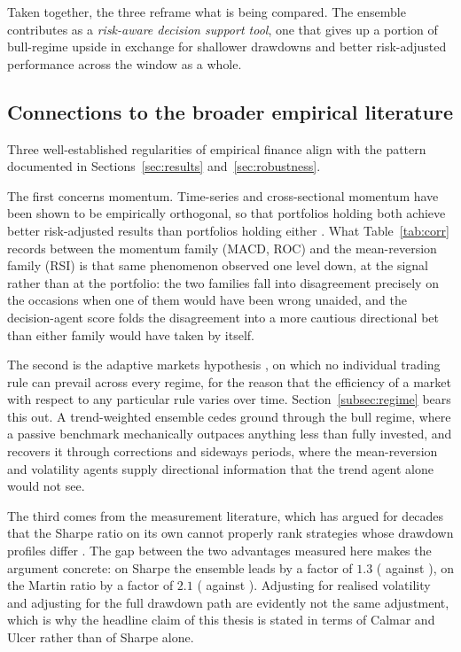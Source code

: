 Taken together, the three reframe what is being compared. The ensemble contributes as a \emph{risk-aware decision support tool}, one that gives up a portion of bull-regime upside in exchange for shallower drawdowns and better risk-adjusted performance across the window as a whole.

\subsection{Connections to the broader empirical literature}\label{subsec:connections}

Three well-established regularities of empirical finance align with the pattern documented in Sections~\ref{sec:results} and~\ref{sec:robustness}.

The first concerns momentum. Time-series and cross-sectional momentum have been shown to be empirically orthogonal, so that portfolios holding both achieve better risk-adjusted results than portfolios holding either \cite{jegadeeshtitman1993,moskowitz2012,asness2013}. What Table~\ref{tab:corr} records between the momentum family (MACD, ROC) and the mean-reversion family (RSI) is that same phenomenon observed one level down, at the signal rather than at the portfolio: the two families fall into disagreement precisely on the occasions when one of them would have been wrong unaided, and the decision-agent score folds the disagreement into a more cautious directional bet than either family would have taken by itself.

The second is the adaptive markets hypothesis \cite{lo2004}, on which no individual trading rule can prevail across every regime, for the reason that the efficiency of a market with respect to any particular rule varies over time. Section~\ref{subsec:regime} bears this out. A trend-weighted ensemble cedes ground through the bull regime, where a passive benchmark mechanically outpaces anything less than fully invested, and recovers it through corrections and sideways periods, where the mean-reversion and volatility agents supply directional information that the trend agent alone would not see.

The third comes from the measurement literature, which has argued for decades that the Sharpe ratio on its own cannot properly rank strategies whose drawdown profiles differ \cite{young1991,sortino1994,martin1989}. The gap between the two advantages measured here makes the argument concrete: on Sharpe the ensemble leads by a factor of $1.3$ (\Shtest{} against \BHsharpe{}), on the Martin ratio by a factor of $2.1$ (\EnsMartin{} against \BHMartin{}). Adjusting for realised volatility and adjusting for the full drawdown path are evidently not the same adjustment, which is why the headline claim of this thesis is stated in terms of Calmar and Ulcer rather than of Sharpe alone.

